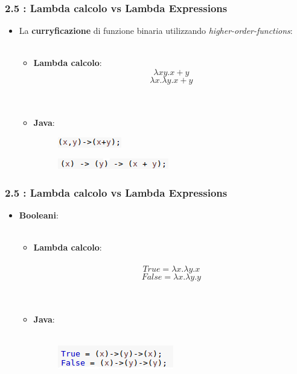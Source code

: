 \documentclass{beamer}
\begin{document}

\begin{frame}
	\frametitle{\textbf{2.5 : Lambda calcolo vs Lambda Expressions}}
	\begin{itemize}
		\item
			La \textbf{curryficazione} di funzione binaria utilizzando \textit{higher-order-functions}:\\\
			\begin{itemize}
				\item 
					\textbf{Lambda calcolo}:
						\[
							\lambda xy.x+y
						\]
						\[
							\lambda x.\lambda y.x+y
						\]\\\
				\item 
					\textbf{Java}:
					\begin{figure}
						\centering
						\includegraphics[width=0.3\linewidth]{image/double.png}
						\label{fig:double}
					\end{figure}
					\begin{figure}
						\centering
						\includegraphics[width=0.4\linewidth]{image/curry.png}
						\label{fig:curry}
					\end{figure}
			\end{itemize}
	\end{itemize}
\end{frame}


\begin{frame}
	\frametitle{\textbf{2.5 : Lambda calcolo vs Lambda Expressions}}
	\begin{itemize}
		\item
			\textbf{Booleani}:\\\
			\begin{itemize}
				\item 
					\textbf{Lambda calcolo}:\\\
						\[
							True = \lambda x.\lambda y.x
						\]
						\[
							False = \lambda x.\lambda y.y
						\]\\\
				\item 
					\textbf{Java}:\\\
					\begin{figure}
						\centering
						\includegraphics[width=0.4\linewidth]{image/booleani.png}
						\label{fig:identity}
					\end{figure}
			\end{itemize}	
	\end{itemize}
\end{frame}
\end{document}
